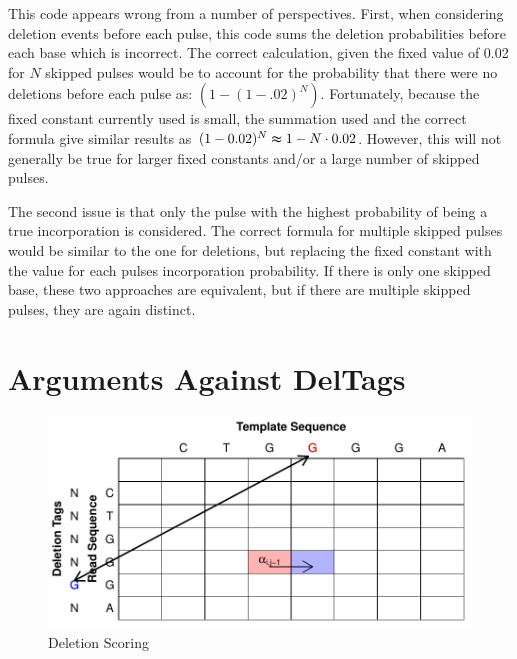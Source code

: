 \documentclass[fleqn,10pt]{SelfArx} %
\begin{document}
This code appears wrong from a number of perspectives.  First, when considering deletion events before each pulse, this code sums the deletion probabilities before each base which is incorrect. The correct calculation, given the fixed value of 0.02 for $N$ skipped pulses would be to account for the probability that there were no deletions before each pulse as: $ (1 - (1-.02)^N)$.  Fortunately, because the fixed constant currently used is small, the summation used and the correct formula give similar results as $(1-0.02)^N \thickapprox 1 - N\cdot0.02$.  However, this will not generally be true for larger fixed constants and/or a large number of skipped pulses.

The second issue is that only the pulse with the highest probability of being a true incorporation is considered.  The correct formula for multiple skipped pulses would be similar to the one for deletions, but replacing the fixed constant with the value for each pulses incorporation probability.  If there is only one skipped base, these two approaches are equivalent, but if there are multiple skipped pulses, they are again distinct.


 




\section{Arguments Against DelTags}

\begin{figure}[ht]\centering %
\includegraphics[width=\linewidth]{Deletion}
\caption{Deletion Scoring}
\label{fig:del}
\end{figure}
\end{document}
